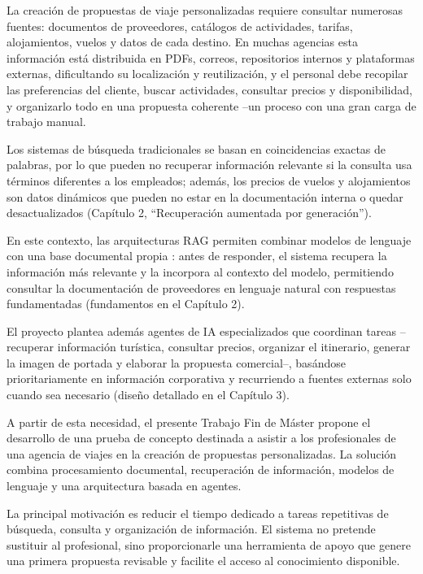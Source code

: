
La creación de propuestas de viaje personalizadas requiere consultar numerosas fuentes: documentos de proveedores, catálogos de actividades, tarifas, alojamientos, vuelos y datos de cada destino. En muchas agencias esta información está distribuida en PDFs, correos, repositorios internos y plataformas externas, dificultando su localización y reutilización, y el personal debe recopilar las preferencias del cliente, buscar actividades, consultar precios y disponibilidad, y organizarlo todo en una propuesta coherente --un proceso con una gran carga de trabajo manual.

Los sistemas de búsqueda tradicionales se basan en coincidencias exactas de palabras, por lo que pueden no recuperar información relevante si la consulta usa términos diferentes a los empleados; además, los precios de vuelos y alojamientos son datos dinámicos que pueden no estar en la documentación interna o quedar desactualizados (Capítulo 2, ``Recuperación aumentada por generación'').

En este contexto, las arquitecturas RAG permiten combinar modelos de lenguaje con una base documental propia \parencite{lewis2020rag}: antes de responder, el sistema recupera la información más relevante y la incorpora al contexto del modelo, permitiendo consultar la documentación de proveedores en lenguaje natural con respuestas fundamentadas (fundamentos en el Capítulo 2).

El proyecto plantea además agentes de IA especializados que coordinan tareas --recuperar información turística, consultar precios, organizar el itinerario, generar la imagen de portada y elaborar la propuesta comercial--, basándose prioritariamente en información corporativa y recurriendo a fuentes externas solo cuando sea necesario (diseño detallado en el Capítulo 3).

A partir de esta necesidad, el presente Trabajo Fin de Máster propone el desarrollo de una prueba de concepto destinada a asistir a los profesionales de una agencia de viajes en la creación de propuestas personalizadas. La solución combina procesamiento documental, recuperación de información, modelos de lenguaje y una arquitectura basada en agentes.

La principal motivación es reducir el tiempo dedicado a tareas repetitivas de búsqueda, consulta y organización de información. El sistema no pretende sustituir al profesional, sino proporcionarle una herramienta de apoyo que genere una primera propuesta revisable y facilite el acceso al conocimiento disponible.

